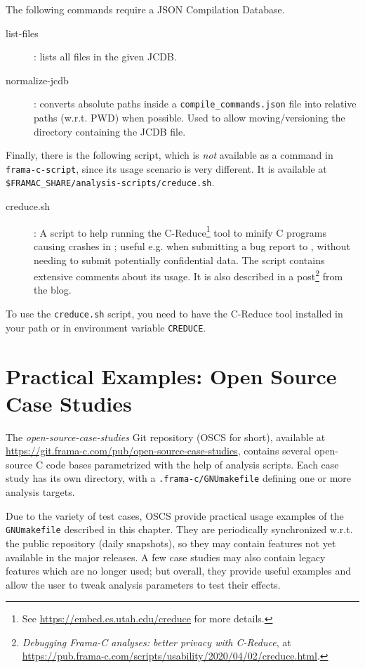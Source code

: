 The following commands require a JSON Compilation Database.

\begin{description}
\item[list-files]: lists all files in the given JCDB.
\item[normalize-jcdb]: converts absolute paths inside a
  \texttt{compile\_commands.json} file into relative paths (w.r.t. PWD)
  when possible. Used to allow moving/versioning the directory containing
  the JCDB file.
\end{description}

Finally, there is the following script, which is {\em not} available as a
command in \texttt{frama-c-script}, since its usage scenario is very
different. It is available at\\
\texttt{\$FRAMAC\_SHARE/analysis-scripts/creduce.sh}.

\begin{description}
\item[creduce.sh]: A script to help running the C-Reduce\footnote{%
  See \url{https://embed.cs.utah.edu/creduce} for more details.} tool to minify
  C programs causing crashes in \FramaC; useful e.g. when submitting a bug
  report to \FramaC, without needing to submit potentially confidential data.
  The script contains extensive comments about its usage. It is also
  described in a post\footnote{%
    {\em Debugging Frama-C analyses: better privacy with C-Reduce},
    at \url{https://pub.frama-c.com/scripts/usability/2020/04/02/creduce.html}.}
  from the \FramaC blog.
\end{description}

To use the \texttt{creduce.sh} script, you need to have the C-Reduce tool
installed in your path or in environment variable \texttt{CREDUCE}.

\section{Practical Examples: Open Source Case Studies}

The {\em open-source-case-studies} Git repository (OSCS for short),
available at \url{https://git.frama-c.com/pub/open-source-case-studies},
contains several open-source C code bases parametrized with the help of
analysis scripts. Each case study has its own directory, with a
\texttt{.frama-c/GNUmakefile} defining one or more analysis targets.

Due to the variety of test cases, OSCS provide practical usage
examples of the \texttt{GNUmakefile} described in this chapter.
They are periodically synchronized w.r.t. the public \FramaC repository
(daily snapshots), so they may contain features not yet available in the
major \FramaC releases. A few case studies may also contain legacy features
which are no longer used; but overall, they provide useful examples and allow
the user to tweak analysis parameters to test their effects.

